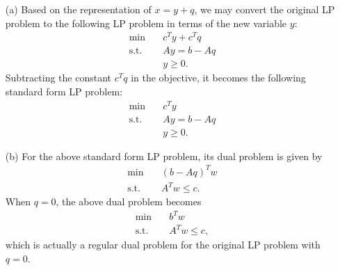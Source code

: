 \documentclass[12pt]{article}
\begin{document}
\begin{itemize}
\item[(a)]Based on the representation of $x=y+q$, we may convert the original LP problem to the following LP problem in terms of the new variable $y$:
\begin{align*}
\min & \quad c^Ty+c^Tq\\
\text{s.t.} & \quad Ay=b-Aq\\
& \quad y\geq 0.
\end{align*}
Subtracting the constant $c^Tq$ in the objective, it becomes the following standard form LP problem:
\begin{align*}
\min & \quad c^Ty\\
\text{s.t.} & \quad Ay=b-Aq\\
& \quad y\geq 0.
\end{align*}
\item[(b)] For the above standard form LP problem, its dual problem is given by
\begin{align*}
\min & \quad (b-Aq)^Tw\\
\text{s.t.} & \quad A^Tw\leq c.
\end{align*}
When $q=0$, the above dual problem becomes
\begin{align*}
\min & \quad b^Tw\\
\text{s.t.} & \quad A^Tw\leq c,
\end{align*}
which is actually a regular dual problem for the original LP problem with $q=0$.
\end{itemize}
\end{document}
